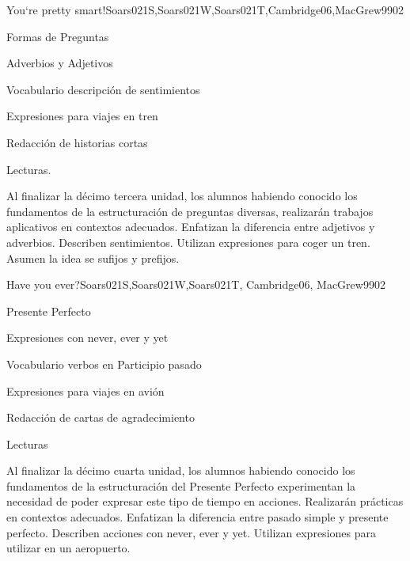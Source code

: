\begin{syllabus}
\begin{unit}{You`re pretty smart!}{Soars021S,Soars021W,Soars021T,Cambridge06,MacGrew99}{0}{2}
\begin{topics}
      \item Formas de Preguntas
      \item Adverbios y Adjetivos
      \item Vocabulario descripción de sentimientos
      \item Expresiones para viajes en tren 
      \item Redacción de historias cortas
      \item Lecturas.
   \end{topics}

   \begin{unitgoals}
      \item Al finalizar la décimo tercera unidad, los alumnos habiendo conocido los fundamentos de la estructuración de preguntas diversas, realizarán trabajos aplicativos en contextos adecuados. Enfatizan la diferencia entre adjetivos y adverbios. Describen sentimientos. Utilizan expresiones para coger un tren. Asumen la idea se sufijos y prefijos.
   \end{unitgoals}

\end{unit}

\begin{unit}{Have you ever?}{Soars021S,Soars021W,Soars021T, Cambridge06, MacGrew99}{0}{2}
   \begin{topics}
      \item Presente Perfecto
      \item Expresiones con never, ever y yet
      \item Vocabulario verbos en Participio pasado
      \item Expresiones para viajes en avión 
      \item Redacción de cartas de agradecimiento
      \item Lecturas
   \end{topics}

   \begin{unitgoals}
      \item Al finalizar la décimo cuarta unidad, los alumnos habiendo conocido los fundamentos de la estructuración del Presente Perfecto experimentan la necesidad de poder expresar este tipo de tiempo en acciones. Realizarán prácticas en contextos adecuados. Enfatizan la diferencia entre pasado simple y presente perfecto. Describen acciones con never, ever y yet. Utilizan expresiones para utilizar en un aeropuerto.
   \end{unitgoals}

\end{unit}



\begin{coursebibliography}
\end{coursebibliography}

\end{syllabus}
%
